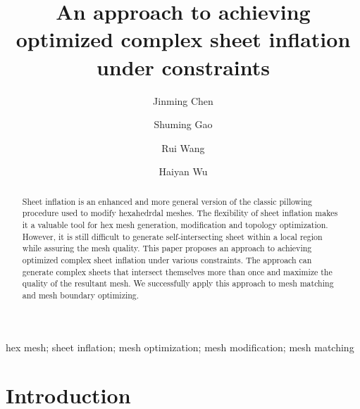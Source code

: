 \documentclass[final,5p,times,twocolumn]{elsarticle}
\begin{document}
\begin{frontmatter}

\title{An approach to achieving optimized complex sheet inflation under constraints}

\author[1]{Jinming Chen}
\author[1]{Shuming Gao}
\author[1]{Rui Wang}
\author[1]{Haiyan Wu}
\address[1]{CAD\&CG State Key Laboratory, Zhejiang University, Hangzhou, China}

\begin{abstract}
Sheet inflation is an enhanced and more general version of the classic pillowing procedure\cite{Mitchell:1995wa} used to modify hexahedrdal meshes. The flexibility of sheet inflation makes it a valuable tool for hex mesh generation, modification and topology optimization. However, it is still difficult to generate self-intersecting sheet within a local region while assuring the mesh quality. This paper proposes an approach to achieving optimized complex sheet inflation under various constraints. The approach can generate complex sheets that intersect themselves more than once and maximize the quality of the resultant mesh. We successfully apply this approach to mesh matching and mesh boundary optimizing.
\end{abstract}

\begin{keyword}
hex mesh; sheet inflation; mesh optimization; mesh modification; mesh matching

\end{keyword}

\end{frontmatter}


\section{Introduction}
\label{sec:intro}
\end{document}
